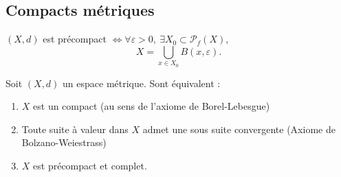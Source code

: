 \subsection{Compacts métriques}
\begin{definition}
    $(X,d)$ est précompact $\Leftrightarrow \forall \varepsilon >0,\ \exists X_0\subset \mathcal{P}_f(X)$, $$X=\bigcup\limits_{x\in X_0} B(x,\varepsilon ).$$
\end{definition}
\begin{theoreme}
    Soit $(X,d)$ un espace métrique. Sont équivalent :
    \begin{enumerate}
        \item $X$ est un compact (au sens de l'axiome de Borel-Lebesgue)
        \item Toute suite à valeur dans $X$ admet une sous suite convergente (Axiome de Bolzano-Weiestrass)
        \item $X$ est précompact et complet.
    \end{enumerate}
\end{theoreme}
